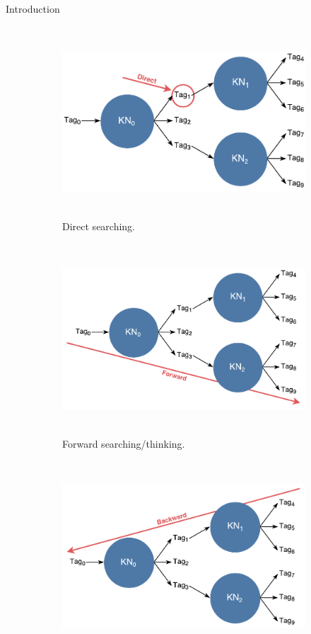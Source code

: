\documentclass[final]{beamer} %
\begin{document}
\begin{frame}
\begin{columns}
\begin{column}{.33\textwidth}
{\begin{block}{Introduction}
					\begin{figure}[!htb]
						\centering
						\begin{subfigure}[!htb]{0.49\columnwidth}
							\centering
							\includegraphics[height=2.8in]{figures/direct_search.pdf}
							\caption{Direct searching.}
						\end{subfigure}
						\begin{subfigure}[!htb]{0.49\columnwidth}
							\centering
							\includegraphics[height=2.8in]{figures/forward_search.pdf}
							\caption{Forward searching/thinking.}
							\label{think_forwards}
						\end{subfigure}
						\bigskip
						\begin{subfigure}[!htb]{0.49\columnwidth}
							\centering
							\includegraphics[height=2.8in]{figures/backward_search.pdf}

\end{subfigure}
\end{figure}
\end{block}}
\end{column}
\end{columns}
\end{frame}
\end{document}

